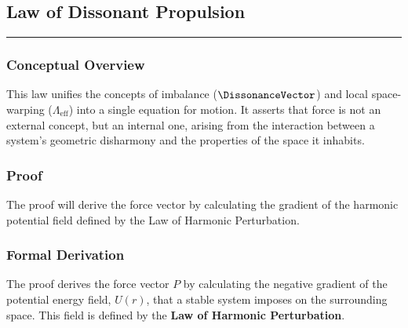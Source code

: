 
\subsection*{Law of Dissonant Propulsion}
\hrule
\vspace{0.3cm}
\vspace{0.5cm}

\subsubsection*{Conceptual Overview}
This law unifies the concepts of imbalance ($\DissonanceVector$) and local space-warping ($\Lambda_{\text{eff}}$) into a single equation for motion.  It asserts that force is not an external concept, but an internal one, arising from the interaction between a system's geometric disharmony and the properties of the space it inhabits. 

\subsubsection*{Proof}
The proof will derive the force vector by calculating the gradient of the harmonic potential field defined by the Law of Harmonic Perturbation. 

\subsubsection*{Formal Derivation}
The proof derives the force vector $P$ by calculating the negative gradient of the potential energy field, $U(r)$, that a stable system imposes on the surrounding space. This field is defined by the \textbf{Law of Harmonic Perturbation}. 

